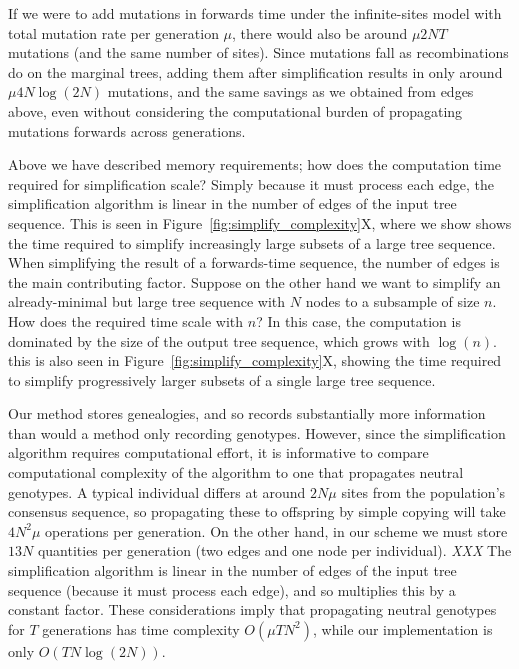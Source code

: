 \documentclass{article}
\newcommand{\plr}[1]{{\em \color{blue} #1}}
\begin{document}
If we were to add mutations in forwards time
under the infinite-sites model with total mutation rate per generation $\mu$,
there would also be around $\mu 2NT$ mutations (and the same number of sites).
Since mutations fall as recombinations do on the marginal trees,
adding them after simplification results in only around $\mu 4 N \log(2N)$ mutations,
and the same savings as we obtained from edges above,
even without considering the
computational burden of propagating mutations forwards across generations.


Above we have described memory requirements;
how does the computation time required for simplification scale?
Simply because it must process each edge,
the simplification algorithm is linear in the number of edges of the input tree sequence.
This is seen in Figure~\ref{fig:simplify_complexity}X,
where we show shows the time required to simplify increasingly large subsets of a large tree sequence.
When simplifying the result of a forwards-time sequence, the number of edges is the main contributing factor.
Suppose on the other hand we want to
simplify an already-minimal but large tree sequence with $N$ nodes
to a subsample of size $n$.
How does the required time scale with $n$?
In this case, the computation is dominated by the size of the output tree sequence,
which grows with $\log(n)$.
this is also seen in Figure~\ref{fig:simplify_complexity}X,
showing the time required to simplify progressively larger subsets of a single large tree sequence.


Our method stores genealogies, and so records substantially more information
than would a method only recording genotypes.
However, since the simplification algorithm requires computational effort,
it is informative to compare computational complexity of the algorithm
to one that propagates neutral genotypes.
A typical individual differs at around $2 N \mu$ sites from the population's consensus sequence,
so propagating these to offspring by simple copying will take $4 N^2 \mu$ operations per generation.
On the other hand,
in our scheme we must store $13N$ quantities per generation (two edges and one node per individual).
\plr{XXX}
The simplification algorithm is linear in the number of edges of the input tree sequence
(because it must process each edge),
and so multiplies this by a constant factor.
These considerations imply that propagating neutral genotypes for $T$ generations has time complexity $O(\mu T N^2)$,
while our implementation is only $O(T N \log(2N))$.
\end{document}
